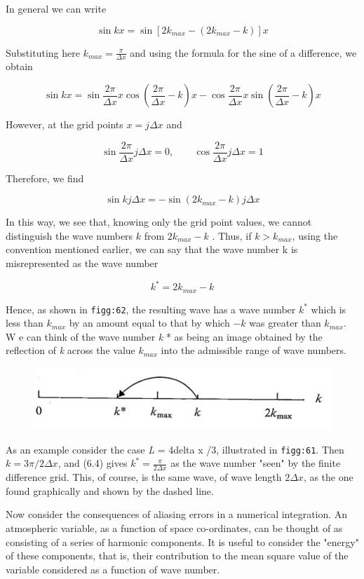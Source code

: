 In general we can write

\[\sin{kx} = \sin{\left[ 2 k_{max} - ( 2 k_{max} - k ) \right] x}\]

Substituting here \(k_{max} = \frac{\pi}{\Delta x}\) and using the
formula for the sine of a difference, we obtain

\[\sin{kx} = \sin{\frac{2\pi}{\Delta x}x}\cos{\left( \frac{2\pi}{\Delta x}
- k \right)}x - \cos{\frac{2\pi}{\Delta x}x}\sin{\left( \frac{2\pi}{\Delta x} - k \right)}x\]

However, at the grid points \(x = j\Delta x\) and

\[\sin\frac{2\pi}{\Delta x}j\Delta x = 0, \qquad \cos{\frac{2\pi}{\Delta x}j\Delta x = 1}\]

Therefore, we find

\[\sin{k j \Delta x} = -\sin{\left( 2k_{max} - k \right)j\Delta x}\]

In this way, we see that, knowing only the grid point values, we cannot
distinguish the wave numbers \(k\) from \(2k_{max} - k\) . Thus, if
\(k > k_{max}\), using the convention mentioned earlier, we can say that
the wave number k is misrepresented as the wave number

\[k^{*} = 2k_{max} - k\]

Hence, as shown in \texttt{figg:62}, the resulting wave has a wave
number \(k^{*}\) which is less than \(k_{max}\) by an amount equal to
that by which \(- k\) was greater than \( k_{max}\). W e can think of
the wave number \emph{k} * as being an image obtained by the reflection
of \emph{k} across the value \(k_{max}\) into the admissible range of
wave numbers.

\begin{figure}
\centering
\includegraphics[width = .7 \textwidth]{figs/NM/pic62.jpg}
\caption{} \label{fig:}
\end{figure}

As an example consider the case \emph{L} = 4delta x /3, illustrated in
\texttt{figg:61}. Then \(k = 3\pi/2\Delta x\), and (6.4) gives
\(k^{*} = \frac{\pi}{2\Delta x}\) as the wave number "seen" by the
finite difference grid. This, of course, is the same wave, of wave
length \(2\Delta x\), as the one found graphically and shown by the
dashed line.

Now consider the consequences of aliasing errors in a numerical
integration. An atmospheric variable, as a function of space
co-ordinates, can be thought of as consisting of a series of harmonic
components. It is useful to consider the "energy" of these components,
that is, their contribution to the mean square value of the variable
considered as a function of wave number.

